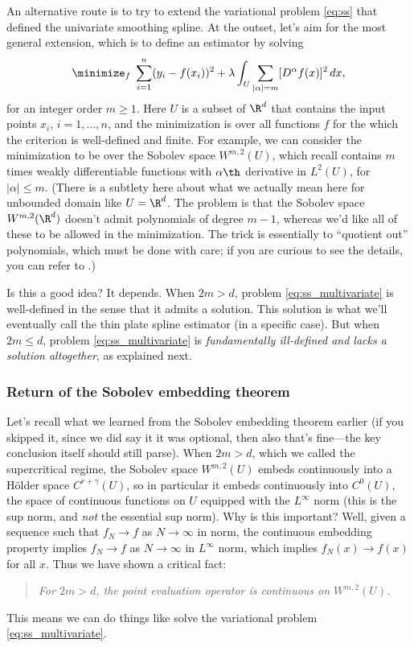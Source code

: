 \documentclass{article}
\begin{document}
An alternative route is to try to extend the variational problem \eqref{eq:ss}
that defined the univariate smoothing spline. At the outset, let's aim for the
most general extension, which is to define an estimator by solving
\begin{equation}
\label{eq:ss_multivariate}
\minimize_f \; \sum_{i=1}^n (y_i - f(x_i))^2 + \lambda \int_U \sum_{|\alpha| =
  m} [D^\alpha f(x)]^2 \, dx,   
\end{equation}
for an integer order $m \geq 1$. Here $U$ is a subset of $\R^d$ that contains
the input points $x_i$, $i=1,\dots,n$, and the minimization is over all
functions $f$ for the which the criterion is well-defined and finite. For
example, we can consider the minimization to be over the Sobolev space
$W^{m,2}(U)$, which recall contains $m$ times weakly differentiable functions
with $\alpha\th$ derivative in $L^2(U)$, for $|\alpha| \leq m$. (There is a
subtlety here about what we actually mean here for unbounded domain like $U =
\R^d$. The problem is that the Sobolev space $W^{m,2}(\R^d)$ doesn't admit
polynomials of degree $m-1$, whereas we'd like all of these to be allowed in the
minimization. The trick is essentially to ``quotient out'' polynomials, which
must be done with care; if you are curious to see the details, you can refer to  
\citet{meinguet1979multivariate, wahba1980some}.) 

Is this a good idea? It depends. When $2m > d$, problem
\eqref{eq:ss_multivariate} is well-defined in the sense that it admits a
solution. This solution is what we'll eventually call the thin plate spline
estimator (in a specific case). But when $2m \leq d$, problem
\eqref{eq:ss_multivariate} is \emph{fundamentally ill-defined and lacks a
  solution altogether}, as explained next. 

\subsubsection{Return of the Sobolev embedding theorem}

Let's recall what we learned from the Sobolev embedding theorem earlier (if you
skipped it, since we did say it it was optional, then also that's fine---the key 
conclusion itself should still parse). When $2m > d$, which we called the
supercritical regime, the Sobolev space $W^{m,2}(U)$ embeds continuously into a
H{\"o}lder space $C^{r+\gamma}(U)$, so in particular it embeds continuously into 
$C^0(U)$, the space of continuous functions on $U$ equipped with the $L^\infty$
norm (this is the sup norm, and \emph{not} the essential sup norm). Why is this
important? Well, given a sequence such that $f_N \to f$ as $N \to \infty$ in
 norm, the continuous embedding property implies
$f_N \to f$ as $N \to \infty$ in $L^\infty$ norm, which implies $f_N(x) \to
f(x)$ for all $x$. Thus we have shown a critical fact: 
\begin{quote}
\centering\it
For $2m > d$, the point evaluation operator is continuous on $W^{m,2}(U)$.   
\end{quote}
This means we can do things like solve the variational problem
\eqref{eq:ss_multivariate}. 
\end{document}
